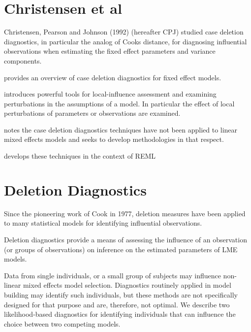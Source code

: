 \documentclass[12pt, a4paper]{report}
\theoremstyle{plain}
\theoremstyle{definition}
\theoremstyle{remark}
\begin{document}
%	
%	
	\section{Christensen et al}         %
	Christensen, Pearson and Johnson (1992) (hereafter CPJ) studied
	case deletion diagnostics, in particular the analog of Cooks
	distance, for diagnosing influential observations when estimating
	the fixed effect parameters and variance
	components.
	
	
	
	\citet{Christiansen}provides an overview of case deletion
	diagnostics for fixed effect models.
	
	\citet{cook86} introduces powerful tools for local-influence
	assessment and examining perturbations in the assumptions of a
	model. In particular the effect of local perturbations of
	parameters or observations are examined.
	
	\citet{Christiansen} notes the case deletion diagnostics
	techniques have not been applied to linear mixed effects models
	and seeks to develop methodologies in that respect.
	
	\citet{Christiansen} develops these techniques in the context of
	REML
	
	
	
	
	\section{Deletion Diagnostics}
	
	
	Since the pioneering work of Cook in 1977, deletion measures have been applied to many statistical models for identifying influential observations.
	
	Deletion diagnostics provide a means of assessing the influence of an observation (or groups of observations) on inference on the estimated parameters of LME models.
	
	Data from single individuals, or a small group of subjects may influence non-linear mixed effects model selection. Diagnostics routinely applied in model building may identify such individuals, but these methods are not specifically designed for that purpose and are, therefore, not optimal. We describe two likelihood-based diagnostics for identifying individuals that can influence the choice between two competing models.
	
\end{document}
